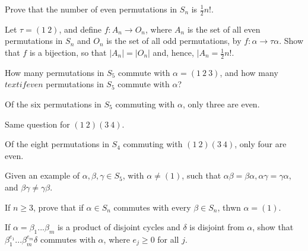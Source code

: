 \documentclass[12pt]{article}
\newenvironment{exercise}[2][Exercise]{\begin{trivlist}
\item[\hskip \labelsep {\bfseries #1}\hskip \labelsep {\bfseries #2.}]}
{\end{trivlist}}
\newenvironment{hint}[2][Hint]{\begin{trivlist}
    \item[\hskip \labelsep {\bfseries #1}\hskip \labelsep {\bfseries #2.}]}
    {\end{trivlist}}
\begin{document}
\begin{exercise}{1.22}
    Prove that the number of even permutations in $S_n$ is $\frac{1}2 n!$.
    \begin{hint}{}
        Let $\tau=(1\:2)$, and define $f: A_n\rightarrow O_n$, where $A_n$ is the set of all even permutations in $S_n$ and $O_n$ is the set of all odd permutations, by $f:\alpha \rightarrow \tau\alpha$. Show that $f$ is a bijection, so that $|A_n|=|O_n|$ and, hence, $|A_n=\frac{1}2 n!$.
    \end{hint}
\end{exercise}


\begin{exercise}{1.23}
    \begin{enumerate}
        \item[(i)] How many permutations in $S_5$ commute with $\alpha = (1\:2\:3)$, and how many $textif{even}$ permutations in $S_5$ commute with $\alpha$?
        \begin{hint}{}
            Of the six permutations in $S_5$ commuting with $\alpha$, only three are even.
        \end{hint} 
        \item[(ii)] Same question for $(1\:2)(3\:4)$.
        \begin{hint}{}
            Of the eight permutations in $S_4$ commuting with $(1\:2)(3\:4)$, only four are even.
        \end{hint} 
    \end{enumerate}
\end{exercise}



\begin{exercise}{1.24}
    Given an example of $\alpha,\beta,\gamma \in S_5$, with $\alpha \neq(1)$, such that $\alpha\beta = \beta\alpha, \alpha\gamma = \gamma\alpha$, and $\beta\gamma \neq \gamma\beta$.
\end{exercise}



\begin{exercise}{1.25}
    If $n\geq3$, prove that if $\alpha\in S_n$ commutes with every $\beta\in S_n$, thwn $\alpha=(1)$.
\end{exercise}


\begin{exercise}{1.26}
    If $\alpha=\beta_1...\beta_m$ is a product of disjoint cycles and $\delta$ is disjoint from $\alpha$, show that $\beta_1^{e_1}...\beta_m^{e_m}\delta$ commutes with $\alpha$, where $e_j\geq0$ for all $j$.
\end{exercise}
\end{document}
